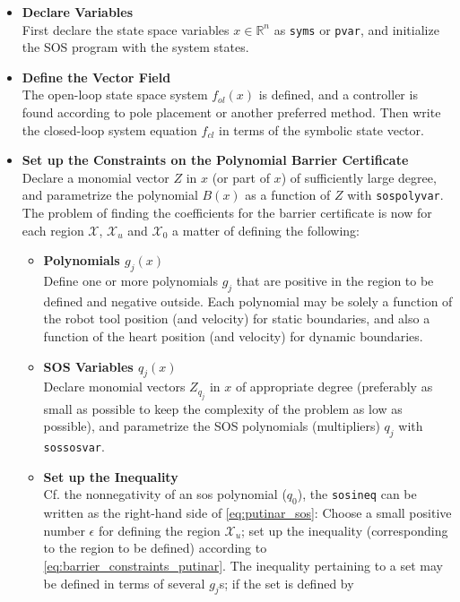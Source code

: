 \renewcommand{\labelitemii}{$\circ$}
\begin{itemize}
\itemsep-0.5mm
\item \textbf{Declare Variables}\\
First declare the state space variables $x\in\mathbb{R}^n$ as \texttt{syms} or \texttt{pvar}, and initialize the SOS program with the system states.
\item \textbf{Define the Vector Field}\\
The open-loop state space system $f_{ol}(x)$ is defined, and a controller is found according to pole placement or another preferred method. Then write the closed-loop system equation $f_{cl}$ in terms of the symbolic state vector.
\item \textbf{Set up the Constraints on the Polynomial Barrier Certificate}\\
Declare a monomial vector $Z$ in $x$ (or part of $x$) of sufficiently large degree, and parametrize the polynomial $B(x)$ as a function of $Z$ with \texttt{sospolyvar}.  
The problem of finding the coefficients for the barrier certificate is now for each region $\mathcal{X}$, $\mathcal{X}_u$ and $\mathcal{X}_0$ a matter of defining the following:
\vspace*{-1mm}
\begin{itemize}
	\item \textbf{Polynomials $g_j(x)$}\\
	Define one or more polynomials $g_j$ that are positive in the region to be defined and negative outside. Each polynomial may be solely a function of the robot tool position (and velocity) for static boundaries, and also a function of the heart position (and velocity) for dynamic boundaries. 
	\item \textbf{SOS Variables $q_j(x)$}\\
	Declare monomial vectors $Z_{q_j}$ in $x$ of appropriate degree (preferably as small as possible to keep the complexity of the problem as low as possible), and parametrize the SOS polynomials (multipliers) $q_j$ with \texttt{sossosvar}.
	\item \textbf{Set up the Inequality}\\
	Cf. the nonnegativity of an \gls{sos} polynomial ($q_0$), the \texttt{sosineq} can be written as the right-hand side of \autoref{eq:putinar_sos}: Choose a small positive number $\epsilon$ for defining the region $\mathcal{X}_u$;
	set up the inequality (corresponding to the region to be defined) according to \autoref{eq:barrier_constraints_putinar}. The inequality pertaining to a set may be defined in terms of several $g_j$s; if the set is defined by

\end{itemize}
\end{itemize}
